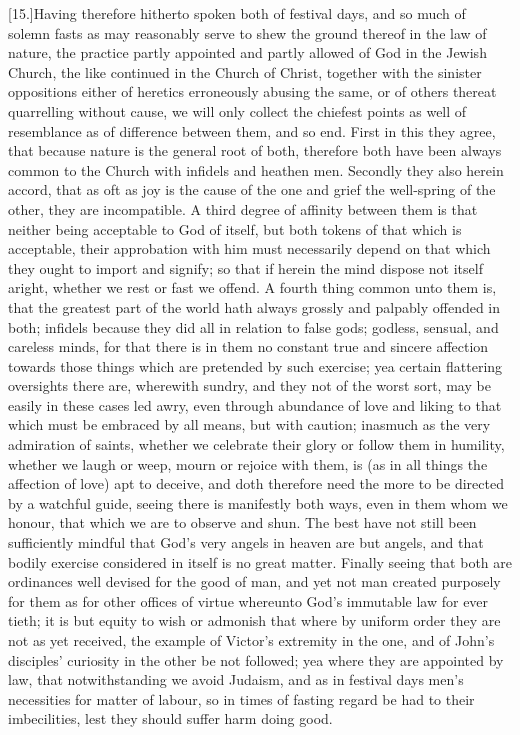 [15.]Having therefore hitherto spoken both of festival days, and so much of solemn fasts as may reasonably serve  to shew the ground thereof in the law of nature,
 the practice partly appointed and partly allowed of God in the Jewish Church, the like continued in the Church of Christ, together with the sinister oppositions either of heretics erroneously abusing the same, or of others thereat quarrelling without cause, we will only collect the chiefest points as well of resemblance as of difference between them, and so end. First in this they agree, that because nature is the general root of both, therefore both have been always common to the Church with infidels and heathen men. Secondly they also herein accord, that as oft as joy is the cause of the one and grief the well-spring of the other, they are incompatible. A third degree of affinity between them is that neither being acceptable to God of itself, but both tokens of that which is acceptable, their approbation with him must necessarily depend on that which they ought to import and signify; so that if herein the mind dispose not itself aright, whether we rest or fast we offend. A fourth thing common unto them is, that the greatest part of the world hath always grossly and palpably offended in both; infidels because they did all in relation to false gods; godless, sensual, and careless minds, for that there is in them no constant true and sincere affection towards those things which are pretended by such exercise; yea certain flattering oversights there are, wherewith sundry, and they not of the worst sort, may be easily in these cases led awry, even through abundance of love and liking to that which must be embraced by all means, but with caution; inasmuch as the very admiration of saints, whether we celebrate their glory or follow them in humility, whether we laugh or weep, mourn or rejoice with them, is (as in all things the affection of love) apt to deceive, and doth therefore need the more to be directed by a watchful guide, seeing there is manifestly both ways, even in them whom we honour, that which we are to observe and shun. The best have not still been sufficiently mindful that God’s very angels in heaven  are but angels, and that bodily exercise considered in itself is no great matter.
 Finally seeing that both are ordinances well devised for the good of man, and yet not man created purposely for them as for other offices of virtue whereunto God’s immutable law for ever tieth; it is but equity to wish or admonish that where by uniform order they are not as yet received, the example of Victor’s extremity in the one, and of John’s disciples’ curiosity in the other be not followed; yea where they are appointed by law, that notwithstanding we avoid Judaism, and as in festival days men’s necessities for matter of labour, so in times of fasting regard be had to their imbecilities, lest they should suffer harm doing good.

